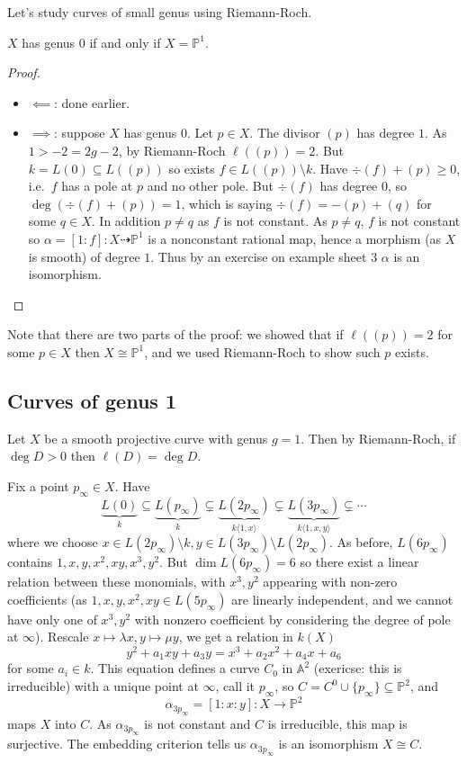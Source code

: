 \documentclass[a4paper]{article}
\renewcommand{\A}{\mathbb{A}}
\renewcommand*{\P}{\mathbb{P}}
\newcommand{\rational}{\dashrightarrow} %
\begin{document}
Let's study curves of small genus using Riemann-Roch.

\begin{proposition}
  \(X\) has genus \(0\) if and only if \(X = \P^1\).
\end{proposition}

\begin{proof}\leavevmode
  \begin{itemize}
  \item \(\impliedby\): done earlier.
  \item \(\implies\): suppose \(X\) has genus \(0\). Let \(p \in X\). The divisor \((p)\) has degree \(1\). As \(1 > -2 = 2g - 2\), by Riemann-Roch \(\ell((p)) = 2\). But \(k = L(0) \subseteq L((p))\) so exists \(f \in L((p)) \setminus k\). Have \(\div(f) + (p) \geq 0\), i.e.\ \(f\) has a pole at \(p\) and no other pole. But \(\div(f)\) has degree \(0\), so \(\deg (\div(f) + (p)) = 1\), which is saying \(\div(f) = -(p) + (q)\) for some \(q \in X\). In addition \(p \neq q\) as \(f\) is not constant. As \(p \neq q\), \(f\) is not constant so \(\alpha = [1:f]: X \rational \P^1\) is a nonconstant rational map, hence a morphism (as \(X\) is smooth) of degree \(1\). Thus by an exercise on example sheet 3 \(\alpha\) is an isomorphism.
  \end{itemize}
\end{proof}
Note that there are two parts of the proof: we showed that if \(\ell((p)) = 2\) for some \(p \in X\) then \(X \cong \P^1\), and we used Riemann-Roch to show such \(p\) exists.

\subsection{Curves of genus 1}

Let \(X\) be a smooth projective curve with genus \(g = 1\). Then by Riemann-Roch, if \(\deg D > 0\) then \(\ell(D) = \deg D\).

Fix a point \(p_\infty \in X\). Have
\[
  \underbrace{L(0)}_k \subseteq \underbrace{L(p_\infty)}_k \subsetneq \underbrace{L(2p_\infty)}_{k\langle 1, x \rangle} \subsetneq \underbrace{L(3p_\infty)}_{k \langle 1, x, y\rangle} \subsetneq \cdots
\]
where we choose \(x \in L(2p_\infty) \setminus k, y \in L(3p_\infty) \setminus L(2p_\infty)\). As before, \(L(6p_\infty)\) contains \(1, x, y, x^2, xy, x^3, y^2\). But \(\dim L(6p_\infty) = 6\) so there exist a linear relation between these monomials, with \(x^3, y^2\) appearing with non-zero coefficients (as \(1, x, y, x^2, xy \in L(5 p_\infty)\) are linearly independent, and we cannot have only one of \(x^3, y^2\) with nonzero coefficient by considering the degree of pole at \(\infty\)). Rescale \(x \mapsto \lambda x, y \mapsto \mu y\), we get a relation in \(k(X)\)
\[
  y^2 + a_1xy + a_3y = x^3 + a_2x^2 + a_4x + a_6
\]
for some \(a_i \in k\). This equation defines a curve \(C_0\) in \(\A^2\) (exericse: this is irreducible) with a unique point at \(\infty\), call it \(p_\infty\), so \(C = C^0 \cup \{p_\infty\} \subseteq \P^2\), and
\[
  \alpha_{3p_\infty} = [1:x:y]: X \to \P^2
\]
maps \(X\) into \(C\). As \(\alpha_{3p_\infty}\) is not constant and \(C\) is irreducible, this map is surjective. The embedding criterion tells us \(\alpha_{3p_\infty}\) is an isomorphism \(X \cong C\).
\end{document}
